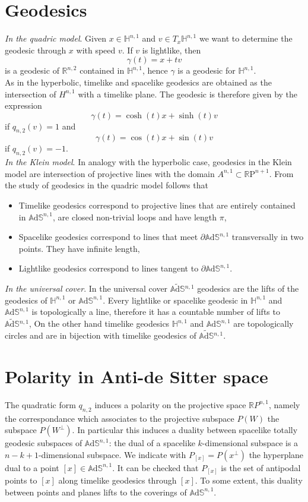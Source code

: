 \documentclass[10pt,a4paper,oneside,reqno]{book}
\def\R{\mathbb{R}}
\def\H{\mathbb{H}}
\def\A{\mathbb{A}\mathrm{d}\mathbb{S}}
\def\AS{\widetilde{\mathbb{A}\mathrm{d}\mathbb{S}}{}}
\theoremstyle{plain}
\theoremstyle{definition}
\theoremstyle{plain}
\theoremstyle{plain}
\theoremstyle{mystyleNormalFont}
\begin{document}
\section{Geodesics}
\textit{In the quadric model}. Given $x\in \H^{n,1}$ and $v \in T_x \H^{n,1}$ we want to determine the geodesic through $x$ with speed $v$.
If $v$ is lightlike, then
\[
\gamma(t) = x + tv
\]
is a geodesic of $\R^{n,2}$ contained in $\H^{n,1}$, hence $\gamma$ is a geodesic for $\H^{n,1}$.\\
As in the hyperbolic, timelike and spacelike geodesics are obtained as the intersection of $H^{n,1}$ with a timelike plane. The geodesic is therefore given by the expression
\[
\gamma(t) = \cosh(t)x + \sinh(t)v
\]
if $q_{n,2}(v)= 1$ and 
\[
\gamma(t) = \cos(t)x + \sin(t)v
\] 
if $q_{n,2}(v)= -1$.\\

\textit{In the Klein model}. In analogy with the hyperbolic case, geodesics in the Klein model are intersection of projective lines with the domain $A^{n,1} \subset \mathbb{R}\text{P}^{n+1}$. From the study of geodesics in the quadric model follows that
\begin{itemize}
    \item Timelike geodesics correspond to projective lines that are entirely contained in $\A^{n,1}$, are closed non-trivial loops and have length $\pi$,
    \item Spacelike geodesics correspond to lines that meet $\partial\A^{n,1}$ transversally in two points. They have infinite length, 
    \item Lightlike geodesics correspond to lines tangent to $\partial\A^{n,1}$.
\end{itemize}

\textit{In the universal cover}. In the universal cover $\AS^{n,1}$ geodesics are the lifts of the geodesics of $\H^{n,1}$ or $\A^{n,1}$. Every lightlike or spacelike geodesic in $\H^{n,1}$ and $\A^{n,1}$ is topologically a line, therefore it has a countable number of lifts to $\AS^{n,1}$, On the other hand timelike geodesics $\H^{n,1}$ and $\A^{n,1}$ are topologically circles and are in bijection with timelike geodesics of $\AS^{n,1}$.\\

\section{Polarity in Anti-de Sitter space}
The quadratic form $q_{n,2}$ induces a polarity on the projective space $\mathbb{R}P^{n,1}$, namely the correspondance which associates to the projective subspace $P(W)$ the subspace $P(W^ \perp)$. In particular this induces a duality between spacelike totally geodesic subspaces of $\A^{n,1}$: the dual of a spacelike $k$-dimensional subspace is a $n-k+1$-dimensional subspace.
We indicate with $P_{[x]}=P(x^\perp)$ the hyperplane dual to a point $[x]\in \A^{n,1}$.
It can be checked that $P_{[x]}$ is the set of antipodal points to $[x]$ along timelike geodesics through $[x]$.
To some extent, this duality between points and planes lifts to the coverings of $\A^{n,1}$.\\
\end{document}
